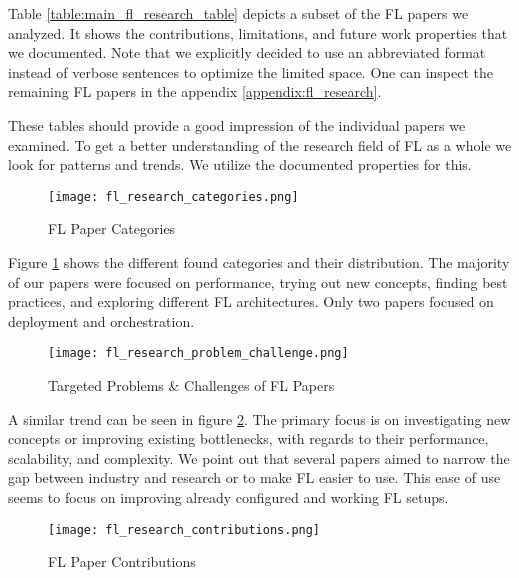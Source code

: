 \begin{figure}[p]
    
\end{figure}

Table \ref{table:main_fl_research_table} depicts a subset of the FL papers we analyzed.
It shows the contributions, limitations, and future work properties that we documented.
Note that we explicitly decided to use an abbreviated format instead of verbose sentences
to optimize the limited space.
One can inspect the remaining FL papers in the appendix \ref{appendix:fl_research}.

These tables should provide a good impression of the individual papers we examined.
To get a better understanding of the research field of FL as a whole we look for patterns and trends.
We utilize the documented properties for this.

\begin{figure}[H]
    \centering
    \texttt{[image: fl\_research\_categories.png]}
    \caption{FL Paper Categories}
    \label{fig:fl_research_categories}
\end{figure}

Figure \ref{fig:fl_research_categories} shows the different found categories and their distribution.
The majority of our papers were focused on performance, trying out new concepts, finding best practices,
and exploring different FL architectures.
Only two papers focused on deployment and orchestration.

\begin{figure}[H]
    \centering
    \texttt{[image: fl\_research\_problem\_challenge.png]}
    \caption{Targeted Problems \& Challenges of FL Papers}
    \label{fig:fl_research_problem_challenge}
\end{figure}

A similar trend can be seen in figure \ref{fig:fl_research_problem_challenge}.
The primary focus is on investigating new concepts or improving existing bottlenecks,
with regards to their performance, scalability, and complexity.
We point out that several papers aimed to narrow the gap between industry and research or
to make FL easier to use.
This ease of use seems to focus on improving already configured and working FL setups.

\begin{figure}[H]
    \centering
    \texttt{[image: fl\_research\_contributions.png]}
    \caption{FL Paper Contributions}
    \label{fig:fl_research_contributions}
\end{figure}

